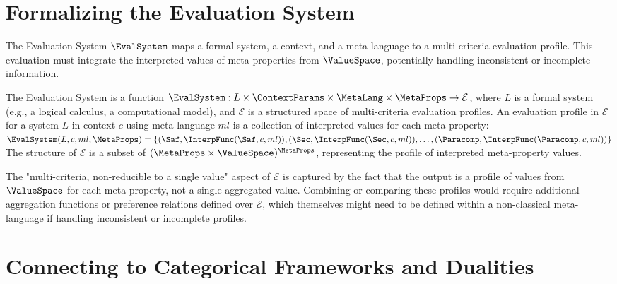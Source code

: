 													\section{Formalizing the Evaluation System}
													
													The Evaluation System $\EvalSystem$ maps a formal system, a context, and a meta-language to a multi-criteria evaluation profile. This evaluation must integrate the interpreted values of meta-properties from $\ValueSpace$, potentially handling inconsistent or incomplete information.
													
													\begin{definition}
														The Evaluation System is a function $\EvalSystem: L \times \ContextParams \times \MetaLang \times \MetaProps \rightarrow \mathcal{E}$, where $L$ is a formal system (e.g., a logical calculus, a computational model), and $\mathcal{E}$ is a structured space of multi-criteria evaluation profiles. An evaluation profile in $\mathcal{E}$ for a system $L$ in context $c$ using meta-language $ml$ is a collection of interpreted values for each meta-property:
														$\EvalSystem(L, c, ml, \MetaProps) = \{ (\Saf, \InterpFunc(\Saf, c, ml)), (\Sec, \InterpFunc(\Sec, c, ml)), \dots, (\Paracomp, \InterpFunc(\Paracomp, c, ml)) \}$
														The structure of $\mathcal{E}$ is a subset of $(\MetaProps \times \ValueSpace)^{\MetaProps}$, representing the profile of interpreted meta-property values.
														\end{definition}
															
															\begin{remark}
																\RaggedRight %
																The "multi-criteria, non-reducible to a single value" aspect of $\mathcal{E}$ is captured by the fact that the output is a profile of values from $\ValueSpace$ for each meta-property, not a single aggregated value. Combining or comparing these profiles would require additional aggregation functions or preference relations defined over $\mathcal{E}$, which themselves might need to be defined within a non-classical meta-language if handling inconsistent or incomplete profiles.
																\end{remark}
																	
																	\section{Connecting to Categorical Frameworks and Dualities}
																	
